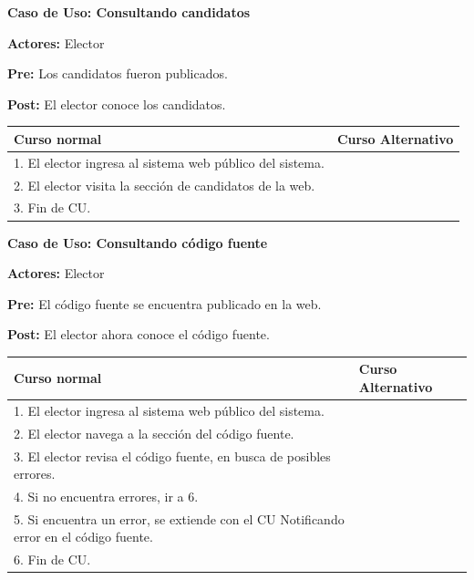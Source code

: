 \textbf{Caso de Uso: Consultando candidatos}

\textbf{Actores:} Elector 

\textbf{Pre:} Los candidatos fueron publicados.

\textbf{Post:}  El elector conoce los candidatos.
\begin{table}[h!]
	
 \begin{tabular}{|p{7.5cm} | p{7.5cm}|} 
 \hline
 \textbf{Curso normal} & \textbf{Curso Alternativo} \\
 \hline
 
1. El elector ingresa al sistema web público del sistema. & \\
 \hline



2. El elector visita la sección de candidatos de la web. & \\
 \hline


3. Fin de CU. & \\
 \hline


 \end{tabular}

\end{table}


\textbf{Caso de Uso: Consultando código fuente}

\textbf{Actores:} Elector

\textbf{Pre:} El código fuente se encuentra publicado en la web.

\textbf{Post:} El elector ahora conoce el código fuente.

\begin{table}[h!]
	
 \begin{tabular}{|p{7.5cm} | p{7.5cm}|} 
 \hline
 \textbf{Curso normal} & \textbf{Curso Alternativo} \\
 \hline
1. El elector ingresa al sistema web público del sistema. & \\
 \hline


2. El elector navega a la sección del código fuente. & \\
 \hline


3. El elector revisa el código fuente, en busca de posibles errores. & \\
 \hline


4. Si no encuentra errores, ir a 6. & \\
 \hline


5. Si encuentra un error, se extiende con el CU Notificando error en el código fuente. & \\
 \hline


6. Fin de CU. & \\
 \hline

 \end{tabular}

\end{table}



